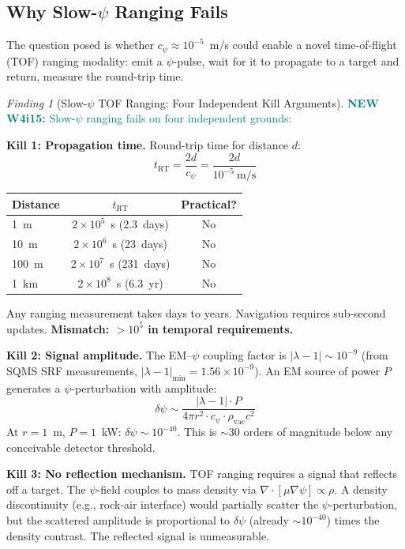 \documentclass[11pt]{article}
\theoremstyle{definition}
\theoremstyle{remark}
\newtheorem{finding}[theorem]{Finding}
\newcommand{\ee}[1]{\times10^{#1}}
\newcommand{\newfinding}[1]{\textcolor{teal}{\textbf{NEW W4i15:} #1}}
\begin{document}
\subsection{Why Slow-$\psi$ Ranging Fails}

The question posed is whether $c_\psi \approx 10^{-5}$~m/s could
enable a novel time-of-flight (TOF) ranging modality: emit a $\psi$-pulse,
wait for it to propagate to a target and return, measure the round-trip
time.

\begin{finding}[Slow-$\psi$ TOF Ranging: Four Independent Kill Arguments]
\label{find:slow-psi-dead}
\newfinding{Slow-$\psi$ ranging fails on four independent grounds:}

\textbf{Kill 1: Propagation time.}
Round-trip time for distance $d$:
\begin{equation}
t_{\mathrm{RT}} = \frac{2d}{c_\psi}
= \frac{2d}{10^{-5}~\mathrm{m/s}}
\end{equation}
\begin{center}
\begin{tabular}{@{}lcc@{}}
\toprule
Distance & $t_{\mathrm{RT}}$ & Practical? \\
\midrule
1~m & $2\ee{5}$~s (2.3~days) & No \\
10~m & $2\ee{6}$~s (23~days) & No \\
100~m & $2\ee{7}$~s (231~days) & No \\
1~km & $2\ee{8}$~s (6.3~yr) & No \\
\bottomrule
\end{tabular}
\end{center}
Any ranging measurement takes days to years. Navigation requires
sub-second updates. \textbf{Mismatch: $>10^5$ in temporal requirements.}

\textbf{Kill 2: Signal amplitude.}
The EM--$\psi$ coupling factor is $|\lambda-1| \sim 10^{-9}$ (from
SQMS SRF measurements, $|\lambda-1|_{\min} = 1.56\ee{-9}$). An
EM source of power $P$ generates a $\psi$-perturbation with amplitude:
\begin{equation}
\delta\psi \sim \frac{|\lambda-1| \cdot P}{4\pi r^2 \cdot c_\psi \cdot \rho_{\mathrm{vac}} c^2}
\end{equation}
At $r = 1$~m, $P = 1$~kW: $\delta\psi \sim 10^{-40}$. This is
$\sim$30 orders of magnitude below any conceivable detector threshold.

\textbf{Kill 3: No reflection mechanism.}
TOF ranging requires a signal that reflects off a target. The
$\psi$-field couples to mass density via $\nabla\cdot[\mu\nabla\psi]
\propto \rho$. A density discontinuity (e.g., rock-air interface)
would partially scatter the $\psi$-perturbation, but the scattered
amplitude is proportional to $\delta\psi$ (already $\sim 10^{-40}$)
times the density contrast. The reflected signal is unmeasurable.


\end{finding}
\end{document}
